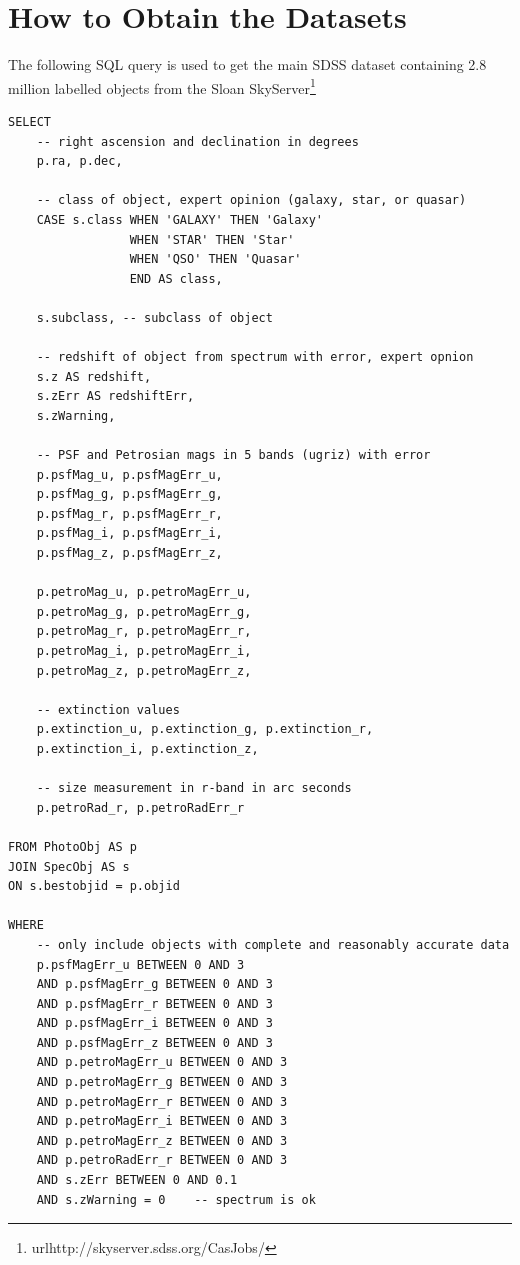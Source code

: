 
\appendix

\chapter{How to Obtain the Datasets}
\label{cha:datasets}

The following SQL query is used to get the main SDSS dataset containing 2.8 million
labelled objects from the Sloan SkyServer\footnote{
	url{http://skyserver.sdss.org/CasJobs/}}

\begin{verbatim}
SELECT
	-- right ascension and declination in degrees
	p.ra, p.dec,
	
	-- class of object, expert opinion (galaxy, star, or quasar)
	CASE s.class WHEN 'GALAXY' THEN 'Galaxy'
				 WHEN 'STAR' THEN 'Star'
				 WHEN 'QSO' THEN 'Quasar'
				 END AS class,
	
	s.subclass, -- subclass of object
	
	-- redshift of object from spectrum with error, expert opnion
	s.z AS redshift,
	s.zErr AS redshiftErr,
	s.zWarning,
	
	-- PSF and Petrosian mags in 5 bands (ugriz) with error
	p.psfMag_u, p.psfMagErr_u,
	p.psfMag_g, p.psfMagErr_g,
	p.psfMag_r, p.psfMagErr_r,
	p.psfMag_i, p.psfMagErr_i,
	p.psfMag_z, p.psfMagErr_z,
	
	p.petroMag_u, p.petroMagErr_u,
	p.petroMag_g, p.petroMagErr_g,
	p.petroMag_r, p.petroMagErr_r,
	p.petroMag_i, p.petroMagErr_i,
	p.petroMag_z, p.petroMagErr_z,
	
	-- extinction values
	p.extinction_u, p.extinction_g, p.extinction_r,
	p.extinction_i, p.extinction_z,
	
	-- size measurement in r-band in arc seconds
	p.petroRad_r, p.petroRadErr_r

FROM PhotoObj AS p
JOIN SpecObj AS s
ON s.bestobjid = p.objid

WHERE
	-- only include objects with complete and reasonably accurate data
	p.psfMagErr_u BETWEEN 0 AND 3
	AND p.psfMagErr_g BETWEEN 0 AND 3
	AND p.psfMagErr_r BETWEEN 0 AND 3
	AND p.psfMagErr_i BETWEEN 0 AND 3
	AND p.psfMagErr_z BETWEEN 0 AND 3
	AND p.petroMagErr_u BETWEEN 0 AND 3
	AND p.petroMagErr_g BETWEEN 0 AND 3
	AND p.petroMagErr_r BETWEEN 0 AND 3
	AND p.petroMagErr_i BETWEEN 0 AND 3
	AND p.petroMagErr_z BETWEEN 0 AND 3
	AND p.petroRadErr_r BETWEEN 0 AND 3
	AND s.zErr BETWEEN 0 AND 0.1
	AND s.zWarning = 0    -- spectrum is ok
\end{verbatim}


